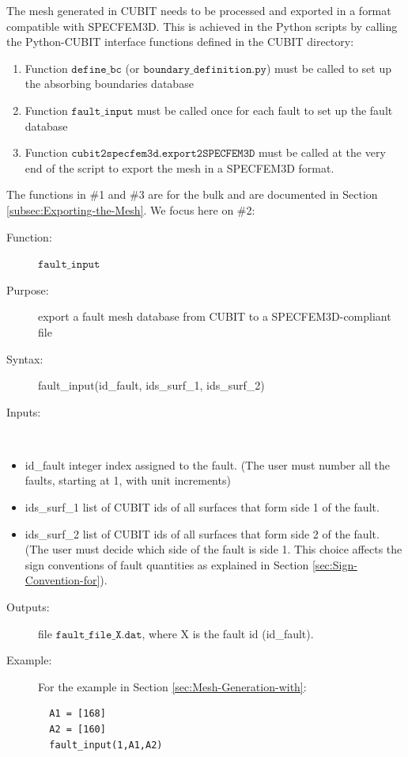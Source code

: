 The mesh generated in CUBIT needs to be processed and exported in
a format compatible with SPECFEM3D. This is achieved in the Python
scripts by calling the Python-CUBIT interface functions defined in
the CUBIT directory:
\begin{enumerate}
\item Function $\mathtt{define\_bc}$ (or $\mathtt{boundary\_definition.py}$)
must be called to set up the absorbing boundaries database
\item Function $\mathtt{fault\_input}$ must be called once for each fault
to set up the fault database
\item Function $\mathtt{cubit2specfem3d.export2SPECFEM3D}$ must be called
at the very end of the script to export the mesh in a SPECFEM3D format.
\end{enumerate}
The functions in \#1 and \#3 are for the bulk and are documented in
Section \ref{subsec:Exporting-the-Mesh}. We focus here on \#2:
\begin{description}
\item [{Function:}] $\mathtt{fault\_input}$
\item [{Purpose:}] export a fault mesh database from CUBIT to a SPECFEM3D-compliant
file
\item [{Syntax:}] fault\_input(id\_fault, ids\_surf\_1, ids\_surf\_2)
\item [{Inputs:}]~\end{description}
\begin{itemize}
\item id\_fault integer index assigned to the fault. (The user must number
all the faults, starting at 1, with unit increments)
\item ids\_surf\_1 list of CUBIT ids of all surfaces that form side 1 of
the fault.
\item ids\_surf\_2 list of CUBIT ids of all surfaces that form side 2 of
the fault. (The user must decide which side of the fault is side 1.
This choice affects the sign conventions of fault quantities as explained
in Section \ref{sec:Sign-Convention-for}).\end{itemize}
\begin{description}
\item [{Outputs:}] file $\mathtt{fault\_file\_X.dat}$, where X is the
fault id (id\_fault).
\item [{Example:}] For the example in Section \ref{sec:Mesh-Generation-with}:
\begin{verbatim}
  A1 = [168]
  A2 = [160]
  fault_input(1,A1,A2)
\end{verbatim}
\end{description}

